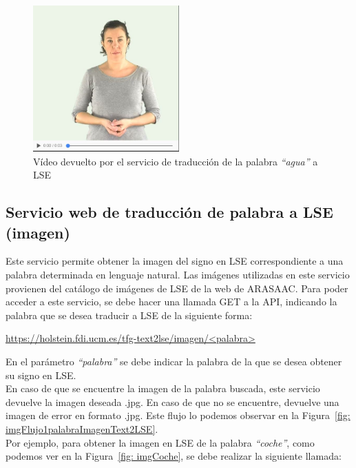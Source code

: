 \begin{figure}[]
	\centering
	\includegraphics[width=0.5\textwidth]{Imagenes/Fuentes/Text2LSE/videoEjemplo.jpg}
	\caption{Vídeo devuelto por el servicio de traducción de la palabra \textit{``agua''} a LSE}
	\label {fig: videoAgua}
\end{figure}

\subsection{Servicio web de traducción de palabra a LSE (imagen)}

Este servicio permite obtener la imagen del signo en LSE correspondiente a una palabra determinada en lenguaje natural. Las imágenes utilizadas en este servicio provienen del catálogo de imágenes de LSE de la web de ARASAAC. Para poder acceder a este servicio, se debe hacer una llamada GET a la API,  indicando la palabra que se desea traducir a LSE de la siguiente forma:\\

\begin{shaded}
	\url{https://holstein.fdi.ucm.es/tfg-text2lse/imagen/<palabra> }	
\end{shaded}

En el parámetro \textit{``palabra''} se debe indicar la palabra de la que se desea obtener su signo en LSE. \\

En caso de que se encuentre la imagen de la palabra buscada, este servicio devuelve la imagen deseada .jpg. En caso de que no se encuentre, devuelve una imagen de error en formato .jpg. Este flujo lo podemos observar en la Figura~\ref {fig: imgFlujo1palabraImagenText2LSE}. \\

Por ejemplo, para obtener la imagen en LSE de la palabra \textit{``coche''}, como podemos ver en la Figura~\ref {fig: imgCoche}, se debe realizar la siguiente llamada:

